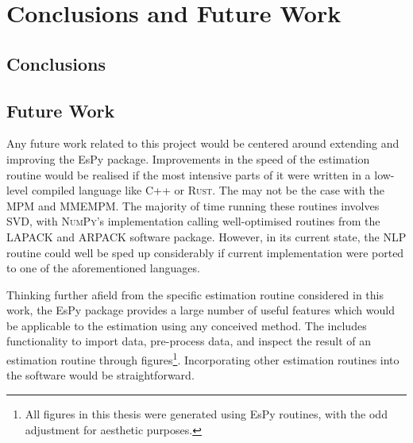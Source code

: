 \chapter{Conclusions and Future Work}
\label{chap:conclusions}

\section{Conclusions}

\section{Future Work}
Any future work related to this project would be centered around extending and
improving the \ac{EsPy} package. Improvements in the speed of the estimation
routine would be realised if the most intensive parts of it were written in a
low-level compiled language like C++ or \textsc{Rust}. The may not be the case
with the \ac{MPM} and \ac{MMEMPM}.  The majority of time running these routines
involves \ac{SVD}, with \textsc{NumPy}'s implementation calling well-optimised
routines from the \textsc{LAPACK} and \textsc{ARPACK} software package. However,
in its current state, the \ac{NLP} routine could well be sped up considerably
if current \Python implementation were ported to one of the aforementioned
languages.

Thinking further afield from the specific estimation routine considered in this
work, the \ac{EsPy} package provides a large number of useful features which
would be applicable to the estimation using any conceived method. The includes
functionality to import data, pre-process data, and inspect the result of an
estimation routine through figures\footnote{
    All figures in this thesis were generated using \ac{EsPy} routines, with
    the odd adjustment for aesthetic purposes.
}. Incorporating other estimation routines into the software would be
straightforward.

